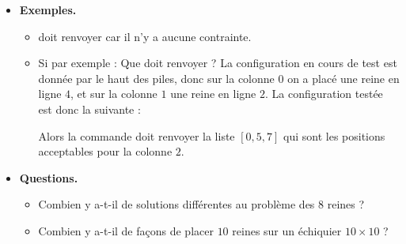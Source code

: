 \documentclass[11pt,class=report,crop=false]{standalone}
\begin{document}
\begin{activite}
\begin{itemize}
\smallskip

  \item \textbf{Exemples.}
  \begin{itemize}
    \item {} doit renvoyer \ci{[0,1,2,...,7]} car il n'y a aucune contrainte.
    \item Si par exemple :   
	Que doit renvoyer  ? La configuration en cours de test est donnée par le haut des piles, donc sur la colonne $0$ on a placé une reine en ligne $4$, et sur la colonne $1$ une reine en ligne $2$. La configuration testée est donc la suivante :
	
	\medskip 
	

	\smallskip 

Alors la commande  doit renvoyer la liste $[0,5,7]$ qui sont les positions acceptables pour la colonne $2$. 
  \end{itemize}

\smallskip

  \item \textbf{Questions.}
  
\begin{itemize}

  \item Combien y a-t-il de solutions différentes au problème des $8$ reines ?
  \item Combien y a-t-il de façons de placer $10$ reines sur un échiquier $10 \times 10$ ?
\end{itemize} 

\end{itemize} 
  
\end{activite}

\end{document}
